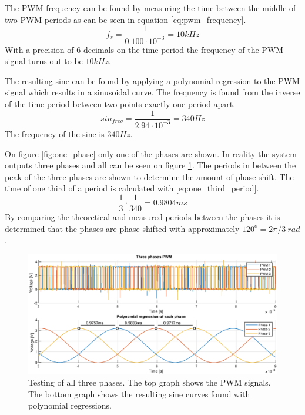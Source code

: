 The PWM frequency can be found by measuring the time between the middle of two PWM periods as can be seen in equation \ref{eq:pwm_frequency}. 
\begin{equation}
    f_s = \frac{1}{0.100 \cdot 10^{-3}} = 10kHz
    \label{eq:pwm_frequency}
\end{equation}
With a precision of 6 decimals on the time period the frequency of the PWM signal turns out to be $10kHz$.

The resulting sine can be found by applying a polynomial regression to the PWM signal which results in a sinusoidal curve. The frequency is found from the inverse of the time period between two points exactly one period apart. 
\begin{equation}
    sin_{freq} = \frac{1}{2.94 \cdot 10^{-3}} = 340 Hz
\end{equation}
The frequency of the sine is $340Hz$.

On figure \ref{fig:one_phase} only one of the phases are shown. In reality the system outputs three phases and all can be seen on figure \ref{fig:three_phases}. The periods in between the peak of the three phases are shown to determine the amount of phase shift. The time of one third of a period is calculated with \ref{eq:one_third_period}.
\begin{equation}
    \frac{1}{3} \cdot \frac{1}{340} = 0.9804ms
    \label{eq:one_third_period}
\end{equation}
By comparing the theoretical and measured periods between the phases it is determined that the phases are phase shifted with approximately $120^o = 2 \pi / 3 \ rad$.
\begin{figure}[H]
	\centering
	\includegraphics[width=1 \textwidth]{pictures/software/three_phases.eps}
	\caption{Testing of all three phases. The top graph shows the PWM signals. The bottom graph shows the resulting sine curves found with polynomial regressions.}
	\label{fig:three_phases}
\end{figure}
